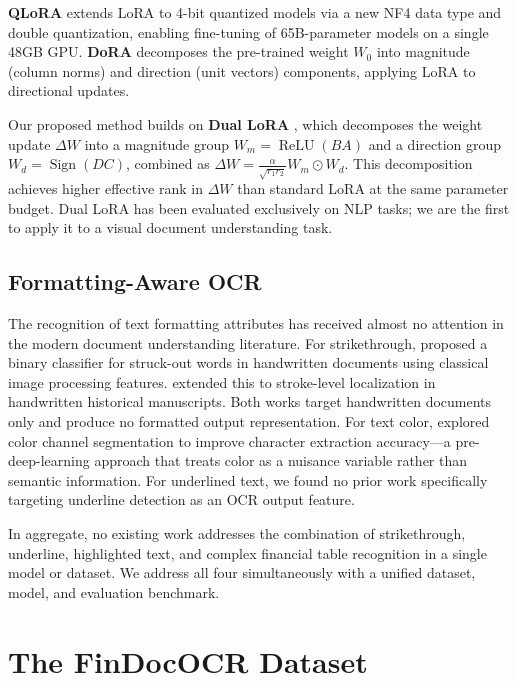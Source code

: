 \documentclass[10pt,twocolumn]{article}
\begin{document}
\textbf{QLoRA} \cite{dettmers2023qlora} extends LoRA to 4-bit quantized models
via a new NF4 data type and double quantization, enabling fine-tuning of
65B-parameter models on a single 48GB GPU. \textbf{DoRA} \cite{liu2024dora}
decomposes the pre-trained weight $W_0$ into magnitude (column norms) and
direction (unit vectors) components, applying LoRA to directional updates.

Our proposed method builds on \textbf{Dual LoRA} \cite{xu2025duallora}, which
decomposes the weight update $\Delta W$ into a magnitude group
$W_m = \operatorname{ReLU}(BA)$ and a direction group
$W_d = \operatorname{Sign}(DC)$, combined as
$\Delta W = \frac{\alpha}{\sqrt{r_1 r_2}} W_m \odot W_d$. This decomposition
achieves higher effective rank in $\Delta W$ than standard LoRA at the same
parameter budget. Dual LoRA has been evaluated exclusively on NLP tasks; we are
the first to apply it to a visual document understanding task.

\subsection{Formatting-Aware OCR}
\label{sec:related:formatting}

The recognition of text formatting attributes has received almost no attention
in the modern document understanding literature. For strikethrough,
\citet{adak2014strikethrough} proposed a binary classifier for struck-out words
in handwritten documents using classical image processing features.
\citet{poddar2021struck} extended this to stroke-level localization in
handwritten historical manuscripts. Both works target handwritten documents only
and produce no formatted output representation. For text color,
\citet{hase2003color} explored color channel segmentation to improve character
extraction accuracy---a pre-deep-learning approach that treats color as a
nuisance variable rather than semantic information. For underlined text, we found
no prior work specifically targeting underline detection as an OCR output feature.

In aggregate, no existing work addresses the combination of strikethrough,
underline, highlighted text, and complex financial table recognition in a single
model or dataset. We address all four simultaneously with a unified dataset,
model, and evaluation benchmark.

\section{The FinDocOCR Dataset}
\label{sec:dataset}
\end{document}
